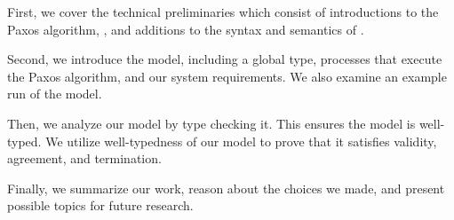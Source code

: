 First, we cover the technical preliminaries which consist of introductions to the Paxos algorithm, \FTMPST, and additions to the syntax and semantics of \FTMPST.

Second, we introduce the model, including a global type, processes that execute the Paxos algorithm, and our system requirements.
We also examine an example run of the model.

Then, we analyze our model by type checking it.
This ensures the model is well-typed.
We utilize well-typedness of our model to prove that it satisfies validity, agreement, and termination.

Finally, we summarize our work, reason about the choices we made, and present possible topics for future research.





